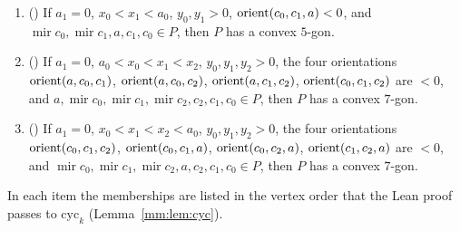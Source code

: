 \begin{proposition}
\begin{enumerate}[label=(\alph*)]
\item () If $a_1=0$, $x_0<x_1<a_0$, $y_0,y_1>0$, $\operatorname{orient}(c_0,c_1,a)<0$, and
  $\operatorname{mir}c_0,\operatorname{mir}c_1,a,c_1,c_0\in P$, then $P$ has a convex $5$-gon.
\item () If $a_1=0$, $a_0<x_0<x_1<x_2$, $y_0,y_1,y_2>0$, the four orientations
  $\operatorname{orient}(a,c_0,c_1)$, $\operatorname{orient}(a,c_0,c_2)$, $\operatorname{orient}(a,c_1,c_2)$, $\operatorname{orient}(c_0,c_1,c_2)$ are $<0$, and
  $a,\operatorname{mir}c_0,\operatorname{mir}c_1,\operatorname{mir}c_2,c_2,c_1,c_0\in P$, then $P$ has a
  convex $7$-gon.
\item () If $a_1=0$, $x_0<x_1<x_2<a_0$, $y_0,y_1,y_2>0$, the four orientations
  $\operatorname{orient}(c_0,c_1,c_2)$, $\operatorname{orient}(c_0,c_1,a)$, $\operatorname{orient}(c_0,c_2,a)$, $\operatorname{orient}(c_1,c_2,a)$ are $<0$, and
  $\operatorname{mir}c_0,\operatorname{mir}c_1,\operatorname{mir}c_2,a,c_2,c_1,c_0\in P$, then $P$ has a
  convex $7$-gon.
\end{enumerate}
In each item the memberships are listed in the vertex order that the Lean proof passes to
$\mathrm{cyc}_k$ (Lemma~\ref{mm:lem:cyc}).
\end{proposition}

